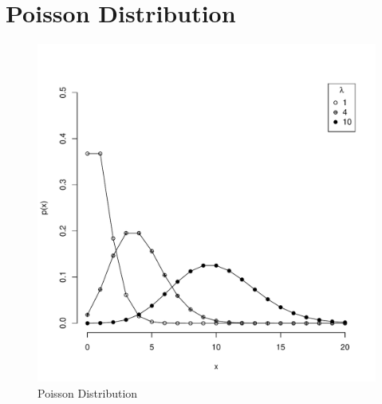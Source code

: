 \documentclass{tufte-handout}
\begin{document}
\section{Poisson Distribution}
\begin{figure}
    \caption{Poisson Distribution}
    \centering
    \includegraphics[width=.70\textwidth]{../distributions/poisson/poisson_bw.pdf}
\end{figure}

\newpage
\end{document}
